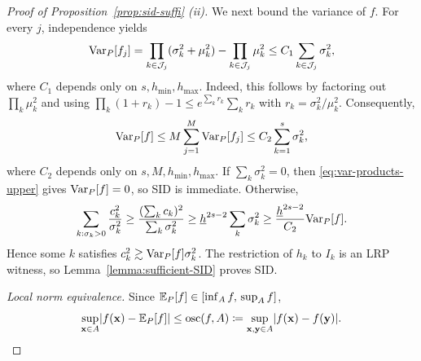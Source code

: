 \documentclass[11pt]{article}
\theoremstyle{plain}
\theoremstyle{definition}
\theoremstyle{remark}
\theoremstyle{plain}
\newcommand{\bx}{\mathbf{x}}
\newcommand{\by}{\mathbf{y}}
\DeclarePairedDelimiter{\bracks}{[}{]}
\DeclarePairedDelimiter{\abs}{|}{|}
\newcommand{\E}{\mathbb{E}}
\newcommand{\Var}{\textnormal{Var}}
\newcommand{\1}{\mathbbm{1}}
\begin{document}
\begin{proof}[Proof of Proposition~\ref{prop:sid-suffi} (ii)]
    We next bound the variance of $f$. For every $j$, independence yields
    \begin{equation*}
      \Var_P[f_j]
      =\prod_{k\in\mathcal J_j}(\sigma_k^2+\mu_k^2)
       -\prod_{k\in\mathcal J_j}\mu_k^2
      \leq C_1\sum_{k\in\mathcal J_j}\sigma_k^2,
    \end{equation*}
    where $C_1$ depends only on $s,h_{\min},h_{\max}$. Indeed, this
    follows by factoring out $\prod_k\mu_k^2$ and using
    $\prod_k(1+r_k)-1\leq e^{\sum_k r_k}\sum_k r_k$ with
    $r_k=\sigma_k^2/\mu_k^2$. Consequently,
    \begin{equation}\label{eq:var-products-upper}
      \Var_P[f]
      \leq M\sum_{j=1}^M\Var_P[f_j]
      \leq C_2\sum_{k=1}^s\sigma_k^2,
    \end{equation}
    where $C_2$ depends only on $s,M,h_{\min},h_{\max}$.
    If $\sum_k\sigma_k^2=0$, then \eqref{eq:var-products-upper} gives
    $\Var_P[f]=0$, so SID is immediate. Otherwise,
    \begin{equation*}
      \sum_{k:\sigma_k>0}\frac{c_k^2}{\sigma_k^2}
      \geq
      \frac{(\sum_k c_k)^2}{\sum_k\sigma_k^2}
      \geq \underline h^{2s-2}\sum_k\sigma_k^2
      \geq \frac{\underline h^{2s-2}}{C_2}\Var_P[f].
    \end{equation*}
    Hence some $k$ satisfies
    $c_k^2\gtrsim \Var_P[f]\sigma_k^2$. The restriction of $h_k$ to
    $I_k$ is an LRP witness, so Lemma~\ref{lemma:sufficient-SID} proves SID.

    \textit{Local norm equivalence.}
    Since $\E_P\bracks*{f} \in [\inf_A f,\, \sup_A f]$,
    \begin{equation}\label{eq:sup-by-osc}
      \sup_{\bx \in A}\abs{f(\bx) - \E_P\bracks*{f}}
      \leq \operatorname{osc}(f, A)
      \coloneqq \sup_{\bx, \by \in A}\abs{f(\bx) - f(\by)}.
    \end{equation}


\end{proof}
\end{document}
